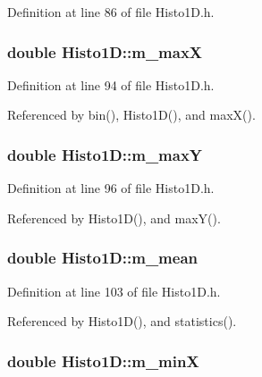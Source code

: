 Definition at line 86 of file Histo1D.h.\hypertarget{classHisto1D_a6a5007569e096537f9b7b39d2aad865b}{
\subsubsection[{m\_\-maxX}]{\setlength{\rightskip}{0pt plus 5cm}double {\bf Histo1D::m\_\-maxX}}}
\label{classHisto1D_a6a5007569e096537f9b7b39d2aad865b}


Definition at line 94 of file Histo1D.h.

Referenced by bin(), Histo1D(), and maxX().\hypertarget{classHisto1D_a28a8995424e36088c47643f8c1a7fa7f}{
\subsubsection[{m\_\-maxY}]{\setlength{\rightskip}{0pt plus 5cm}double {\bf Histo1D::m\_\-maxY}}}
\label{classHisto1D_a28a8995424e36088c47643f8c1a7fa7f}


Definition at line 96 of file Histo1D.h.

Referenced by Histo1D(), and maxY().\hypertarget{classHisto1D_a7e49893543fb5d2af37167690bc0b0ff}{
\subsubsection[{m\_\-mean}]{\setlength{\rightskip}{0pt plus 5cm}double {\bf Histo1D::m\_\-mean}}}
\label{classHisto1D_a7e49893543fb5d2af37167690bc0b0ff}


Definition at line 103 of file Histo1D.h.

Referenced by Histo1D(), and statistics().\hypertarget{classHisto1D_af5ce58b20e96fa6e4b306109dd88589e}{
\subsubsection[{m\_\-minX}]{\setlength{\rightskip}{0pt plus 5cm}double {\bf Histo1D::m\_\-minX}}}
\label{classHisto1D_af5ce58b20e96fa6e4b306109dd88589e}


